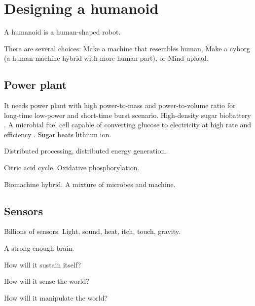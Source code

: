 \chapter{Designing a humanoid}

A humanoid is a human-shaped robot.

There are several choices:
Make a machine that resembles human,
Make a cyborg (a human-machine hybrid with more human part),
or Mind upload.

\section{Power plant}

It needs power plant with high power-to-mass and power-to-volume ratio
for long-time low-power and short-time burst scenario.
High-density sugar biobattery \cite{zhu2014high}.
A microbial fuel cell capable of converting glucose to
electricity at high rate and efficiency \cite{rabaey2003microbial}.
Sugar beats lithium ion.

Distributed processing, distributed energy generation.

Citric acid cycle.
Oxidative phosphorylation.

Biomachine hybrid.
A mixture of microbes and machine.

\section{Sensors}

Billions of sensors.
Light, sound, heat, itch, touch, gravity.

A strong enough brain.

How will it sustain itself?

How will it sense the world?

How will it manipulate the world?
